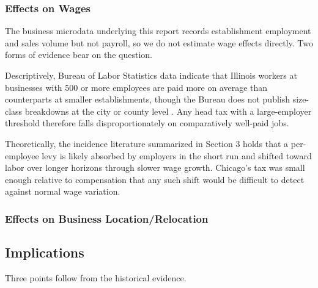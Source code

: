 \documentclass[12pt,letterpaper]{article}
\newif\ifdraft
\newcommand{\TODO}[1]{\ifdraft\textcolor{red}{\textbf{[TODO: #1]}}\fi}
\begin{document}
\subsubsection{Effects on Wages}

The business microdata underlying this report records establishment employment and sales volume but not payroll, so we do not estimate wage effects directly. Two forms of evidence bear on the question.

Descriptively, Bureau of Labor Statistics data indicate that Illinois workers at businesses with 500 or more employees are paid more on average than counterparts at smaller establishments, though the Bureau does not publish size-class breakdowns at the city or county level \citep{woelfel2025}. Any head tax with a large-employer threshold therefore falls disproportionately on comparatively well-paid jobs.

Theoretically, the incidence literature summarized in Section 3 holds that a per-employee levy is likely absorbed by employers in the short run and shifted toward labor over longer horizons through slower wage growth. Chicago's tax was small enough relative to compensation that any such shift would be difficult to detect against normal wage variation.

\TODO{Confirm with Marlowe whether this subsection stays at this scope or folds into Implications.}

\subsubsection{Effects on Business Location/Relocation}

\TODO{Scope decision needed. A credible estimate requires a border-discontinuity design comparing establishments immediately inside and outside the city line. The geocoding supports it: match codes are parcel or site level on 91.3 percent of Illinois records, and excluding ZIP-centroid matches costs about 6.5 percent of Chicago rows. It is a separate build and unlikely to fit this cycle. Fallback is descriptive relocation evidence plus the literature. Note that the comparison with suburban Cook in the bunching results is informative about relocation only indirectly.}

\subsection{Implications}

Three points follow from the historical evidence.
\end{document}

